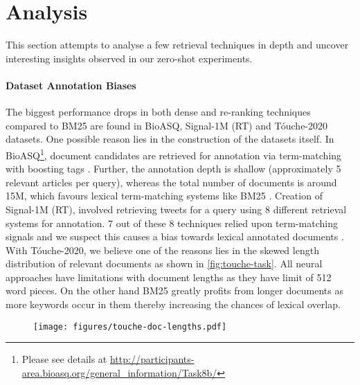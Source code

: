 \documentclass[11pt]{article}
\begin{document}
\section{Analysis}\label{sec:analysis}
This section attempts to analyse a few retrieval techniques in depth and uncover interesting insights observed in our zero-shot experiments.

\paragraph{Dataset Annotation Biases}\label{sec:dataset_biases} The biggest performance drops in both dense and re-ranking techniques compared to BM25 are found in BioASQ, Signal-1M (RT) and T\'ouche-2020 datasets. One possible reason lies in the construction of the datasets itself. In BioASQ\footnote{Please see details at \url{http://participants-area.bioasq.org/general_information/Task8b/}}, document candidates are retrieved for annotation via term-matching with boosting tags \cite{tsatsaronis2015overview}. Further, the annotation depth is shallow (approximately 5 relevant articles per query), whereas the total number of documents is around 15M, which favours lexical term-matching systems like BM25 \cite{liang2020embeddingbased}. Creation of Signal-1M (RT), involved retrieving tweets for a query using 8 different retrieval systems for annotation. 7 out of these 8 techniques relied upon term-matching signals and we suspect this causes a bias towards lexical annotated documents \cite{Signal1MRelatedTweetsRetrieval2018}. With T\'ouche-2020, we believe one of the reasons lies in the skewed length distribution of relevant documents as shown in \autoref{fig:touche-task}. All neural approaches have limitations with document lengths as they have limit of 512 word pieces. On the other hand BM25 greatly profits from longer documents as more keywords occur in them thereby increasing the chances of lexical overlap. 

\begin{figure}[htb!]
\centering
\begin{center}
    \texttt{[image: figures/touche-doc-lengths.pdf]}
    \label{fig:touche-task}
    \vspace*{-\baselineskip}
\end{center}
\end{figure}
\end{document}
